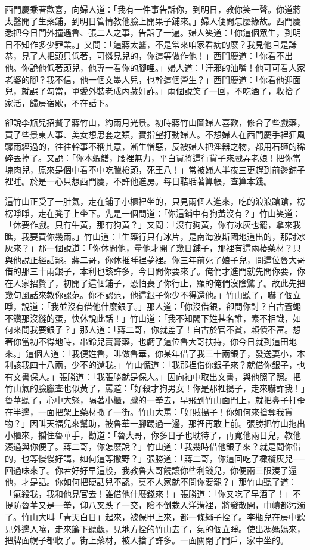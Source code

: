 \begin{showcontents}{}
西門慶乘著歡喜，向婦人道：「我有一件事告訴你，到明日，教你笑一聲。你道蔣太醫開了生藥鋪，到明日管情教他臉上開果子鋪來。」婦人便問怎麼緣故。西門慶悉把今日門外撞遇魯、張二人之事，告訴了一遍。婦人笑道：「你這個眾生，到明日不知作多少罪業。」又問：「這蔣太醫，不是常來咱家看病的麼？我見他且是謙恭，見了人把頭只低著，可憐見兒的，你這等做作他！」西門慶道：「你看不出他。你說他低著頭兒，他專一看你的腳哩。」婦人道：「汗邪的油嘴！他可可看人家老婆的腳？我不信，他一個文墨人兒，也幹這個營生？」西門慶道：「你看他迎面兒，就誤了勾當，單愛外裝老成內藏奸詐。」兩個說笑了一回，不吃酒了，收拾了家活，歸房宿歇，不在話下。

卻說李瓶兒招贅了蔣竹山，約兩月光景。初時蔣竹山圖婦人喜歡，修合了些戲藥，買了些景東人事、美女想思套之類，實指望打動婦人。不想婦人在西門慶手裡狂風驟雨經過的，往往幹事不稱其意，漸生憎惡，反被婦人把淫器之物，都用石砸的稀碎丟掉了。又說：「你本蝦鱔，腰裡無力，平白買將這行貨子來戲弄老娘！把你當塊肉兒，原來是個中看不中吃臘槍頭，死王八！」常被婦人半夜三更趕到前邊鋪子裡睡。於是一心只想西門慶，不許他進房。每日聐聒著算帳，查算本錢。

這竹山正受了一肚氣，走在鋪子小櫃裡坐的，只見兩個人進來，吃的浪浪蹌蹌，楞楞睜睜，走在凳子上坐下。先是一個問道：「你這鋪中有狗黃沒有？」竹山笑道： 「休要作戲。只有牛黃，那有狗黃？」又問：「沒有狗黃，你有冰灰也罷，拿來我瞧，我要買你幾兩。」竹山道：「生藥行只有冰片，是南海波斯國地道出的，那討冰灰來？」那一個說道：「你休問他，量他才開了幾日鋪子，那裡有這兩椿藥材？只與他說正經話罷。蔣二哥，你休推睡裡夢裡。你三年前死了娘子兒，問這位魯大哥借的那三十兩銀子，本利也該許多，今日問你要來了。俺們才進門就先問你要，你在人家招贅了，初開了這個鋪子，恐怕喪了你行止，顯的俺們沒陰騭了。故此先把幾句風話來教你認范。你不認范，他這銀子你少不得還他。」竹山聽了，嚇了個立睜，說道：「我並沒有借他什麼銀子。」那人道：「你沒借銀，卻問你討？自古蒼蠅不鑽那沒縫的蛋，快休說此話！」竹山道：「我不知閣下姓甚名誰，素不相識，如何來問我要銀子？」那人道：「蔣二哥，你就差了！自古於官不貧，賴債不富。想著你當初不得地時，串鈴兒賣膏藥，也虧了這位魯大哥扶持，你今日就到這田地來。」這個人道：「我便姓魯，叫做魯華，你某年借了我三十兩銀子，發送妻小，本利該我四十八兩，少不的還我。」竹山慌道：「我那裡借你銀子來？就借你銀子，也有文書保人。」張勝道：「我張勝就是保人。」因向袖中取出文書，與他照了照。把竹山氣的臉臘查也似黃了，罵道：「好殺才狗男女！你是那裡搗子，走來嚇詐我！」魯華聽了，心中大怒，隔著小櫃，颼的一拳去，早飛到竹山面門上，就把鼻子打歪在半邊，一面把架上藥材撒了一街。竹山大罵：「好賊搗子！你如何來搶奪我貨物？」因叫天福兒來幫助，被魯華一腳踢過一邊，那裡再敢上前。張勝把竹山拖出小櫃來，攔住魯華手，勸道：「魯大哥，你多日子也耽待了，再寬他兩日兒，教他湊過與你便了。蔣二哥，你怎麼說？」竹山道：「我幾時借他銀子來？就是問你借的，也等慢慢好講，如何這等撒野？」張勝道：「蔣二哥，你這回吃了橄欖灰兒──回過味來了。你若好好早這般，我教魯大哥饒讓你些利錢兒，你便兩三限湊了還他，才是話。你如何把硬話兒不認，莫不人家就不問你要罷？」那竹山聽了道：「氣殺我，我和他見官去！誰借他什麼錢來！」張勝道：「你又吃了早酒了！」不提防魯華又是一拳，仰八叉跌了一交，險不倒栽入洋溝裡，將發散開，巾幘都污濁了。竹山大叫「青天白日」起來，被保甲上來，都一條繩子拴了。李瓶兒在房中聽見外邊人嚷，走來簾下聽覷，見地方拴的竹山去了，氣的個立睜。使出馮媽媽來，把牌面幌子都收了。街上藥材，被人搶了許多。一面關閉了門戶，家中坐的。


\end{showcontents}
